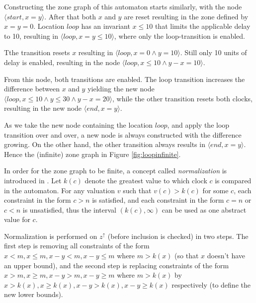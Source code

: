 \begin{example}
Constructing the zone graph of this automaton starts similarly, with the node $\langle start, x=y \rangle$. After that both $x$ and $y$ are reset resulting in the zone defined by $x=y=0$. Location $loop$ has an invariant $x \leq 10$ that limits the applicable delay to 10, resulting in $\langle loop, x=y \leq 10 \rangle$, where only the loop-transition is enabled.

Tthe transition resets $x$ resulting in $\langle loop, x=0 \wedge y=10 \rangle$. Still only 10 units of delay is enabled, resulting in the node $\langle loop, x \leq 10 \wedge y-x=10 \rangle$.

From this node, both transitions are enabled. The loop transition increases the difference between $x$ and $y$ yielding the new node $\langle loop, x \leq 10 \wedge y \leq 30 \wedge y-x=20 \rangle$, while the other transition resets both clocks, resulting in the new node $\langle end, x=y \rangle$.

As we take the new node containing the location $loop$, and apply the loop transition over and over, a new node is always constructed with the difference growing. On the other hand, the other transition always results in $\langle end, x=y \rangle$.
Hence the (infinite) zone graph in Figure \ref{fig:loopinfinite}.

\end{example}
	
In order for the zone graph to be finite, a concept called \emph{normalization} is introduced in \cite{bengtsson2004timed}.
Let $k(c)$ denote the greatest value to which clock $c$ is compared in the automaton.
For any valuation $v$ such that $v(c)>k(c)$ for some $c$, each constraint in the form $c > n$ is satisfied, and each constraint in the form $c = n$ or $c < n$ is unsatisfied, thus the interval $(k(c),\infty)$ can be used as one abstract value for $c$. 

Normalization is performed on $z^\uparrow$ (before inclusion is checked) in two steps. The first step is removing all constraints of the form $x < m, x \leq m, x-y <m, x-y\leq m$ where $m>k(x)$ (so that $x$ doesn't have an upper bound), and the second step is replacing constraints of the form $x > m, x \geq m, x-y >m, x-y\geq m$ where $m>k(x)$ by $x > k(x), x \geq k(x), x-y >k(x), x-y\geq k(x)$ respectively (to define the new lower bounds).

